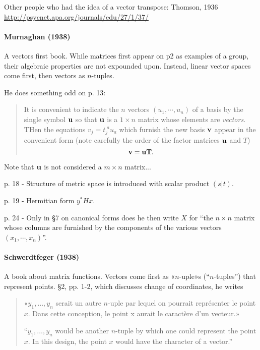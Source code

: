 Other people who had the idea of a vector transpose:
Thomson, 1936
\url{http://psycnet.apa.org/journals/edu/27/1/37/}


\paragraph{Murnaghan (1938)~\cite{Murnaghan1938}}

A vectors first book. While matrices first appear on p2 as examples of a group,
their algebraic properties are not expounded upon. Instead, linear vector spaces
come first, then vectors as $n$-tuples.

He does something odd on p. 13:

\begin{quote}
    It is convenient to indicate the $n$ vectors $(u_1, \cdots, u_n)$ of a basis
    by the single symbol $\bf u$ so that $\bf u$ is a $1\times n$ matrix
    whose elements are \textit{vectors}. THen the equations $v_j = t_j^{\;a} u_a$
    which furnish the new basis $\bf v$ appear in the convenient form (note
    carefully the order of the factor matrices $\bf u$ and $T$)
    \[
    \bf v = \bf u T.
    \]
\end{quote}

Note that $\bf u$ is not considered a $m\times n$ matrix...

p. 18 - Structure of metric space is introduced with scalar product $(s|t)$.

p. 19 - Hermitian form $y^* H x$.

p. 24 - Only in \S7 on canonical forms does he then write $X$ for ``the $n\times n$
matrix whose columns are furnished by the components of the various vectors
$(x_1, \cdots, x_n)$''.



\paragraph{Schwerdtfeger (1938)~\cite{Schwerdtfeger1938}}

A book about matrix functions.
Vectors come first as «$n$-uple»s (``$n$-tuples'') that represent points. \S 2, pp. 1-2, which discusses change of coordinates, he writes
\begin{quote}
«$y_1, \dots, y_n$ serait un autre $n$-uple par lequel on pourrait représenter le point $x$. Dans cette conception, le point x aurait le caractère d'un vecteur.»

``$y_1, \dots, y_n$ would be another $n$-tuple by which one could represent the point $x$. In this design, the point $x$ would have the character of a vector.''
\end{quote}

